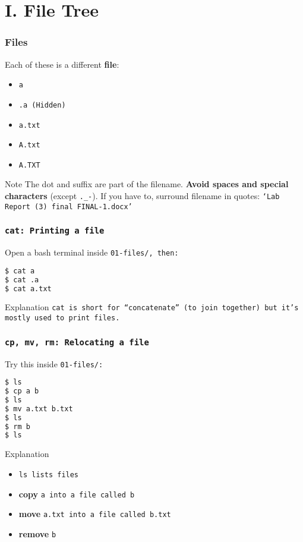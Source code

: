 \section{I. File Tree}
\begin{frame}[fragile]
\frametitle{Files}
Each of these is a different \textbf{file}:
\begin{itemize}
    \item \tt{a}
    \item \tt{.a} (Hidden)
    \item \tt{a.txt}
    \item \tt{A.txt}
    \item \tt{A.TXT}
\end{itemize}

\begin{block}{Note}
    The dot and suffix are part of the filename.
    \newline \newline
    \textbf{Avoid spaces and special characters} (except \verb|._-|).
    If you have to, surround filename in quotes:
    \tt{`Lab Report (3) final FINAL-1.docx'}
\end{block}
\end{frame}

\begin{frame}[fragile]
\frametitle{\tt{cat}: Printing a file}
Open a bash terminal inside \tt{01-files/}, then:
\begin{lstlisting}[language=bash]
$ cat a
$ cat .a
$ cat a.txt
\end{lstlisting}
\begin{block}{Explanation}
    \tt{cat} is short for ``concatenate'' (to join together) but it's
    mostly used to print files.
\end{block}
\end{frame}

\begin{frame}[fragile]
\frametitle{\tt{cp, mv, rm}: Relocating a file}
Try this inside \tt{01-files/}:
\begin{lstlisting}[language=bash]
$ ls
$ cp a b
$ ls
$ mv a.txt b.txt
$ ls
$ rm b
$ ls
\end{lstlisting}
\begin{block}{Explanation}
    \begin{itemize}
        \item \tt{ls} lists files
        \item \textbf{copy} \tt{a} into a file called \tt{b}
        \item \textbf{move} \tt{a.txt} into a file called \tt{b.txt}
        \item \textbf{remove} \tt{b}
    \end{itemize}
\end{block}
\end{frame}

